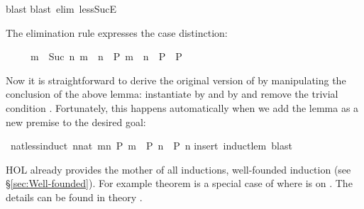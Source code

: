\begin{isabellebody}
blast{\isacharparenright}\isanewline
\isamarkupfalse%
blast\ elim{\isacharcolon}\ less{\isacharunderscore}SucE{\isacharparenright}\isamarkupfalse%
%
\begin{isamarkuptext}%
\noindent
The elimination rule  expresses the case distinction:
\begin{isabelle}%
\ \ \ \ \ {\isasymlbrakk}m\ {\isacharless}\ Suc\ n{\isacharsemicolon}\ m\ {\isacharless}\ n\ {\isasymLongrightarrow}\ P{\isacharsemicolon}\ m\ {\isacharequal}\ n\ {\isasymLongrightarrow}\ P{\isasymrbrakk}\ {\isasymLongrightarrow}\ P%
\end{isabelle}

Now it is straightforward to derive the original version of
 by manipulating the conclusion of the above
lemma: instantiate  by  and  by 
and remove the trivial condition . Fortunately, this
happens automatically when we add the lemma as a new premise to the
desired goal:%
\end{isamarkuptext}%
\isamarkuptrue%
\ nat{\isacharunderscore}less{\isacharunderscore}induct{\isacharcolon}\ {\isachardoublequote}{\isacharparenleft}{\isasymAnd}n{\isacharcolon}{\isacharcolon}nat{\isachardot}\ {\isasymforall}m{\isacharless}n{\isachardot}\ P\ m\ {\isasymLongrightarrow}\ P\ n{\isacharparenright}\ {\isasymLongrightarrow}\ P\ n{\isachardoublequote}\isanewline
\isamarkupfalse%
insert\ induct{\isacharunderscore}lem{\isacharcomma}\ blast{\isacharparenright}\isamarkupfalse%
%
\begin{isamarkuptext}%
HOL already provides the mother of
all inductions, well-founded induction (see \S\ref{sec:Well-founded}).  For
example theorem  is
a special case of  where  is \isa{{\isacharless}} on
. The details can be found in theory .%
\end{isamarkuptext}%
\isamarkuptrue%
\isamarkupfalse%
\end{isabellebody}%

